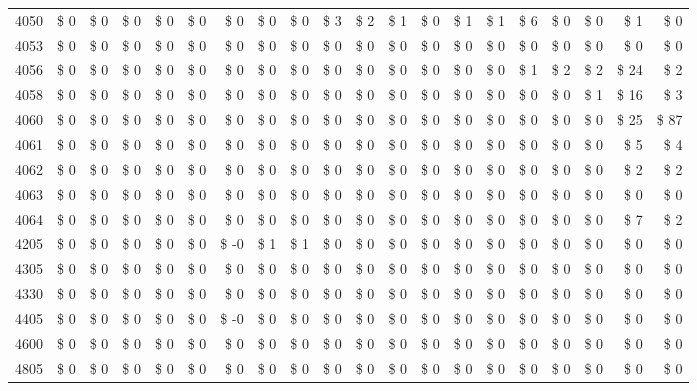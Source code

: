 \begin{longtable}{lrrrrrrrrrrrrrrrrrrr}
4050 & \$ 0 & \$ 0 & \$ 0 & \$ 0 & \$ 0 & \$ 0 & \$ 0 & \$ 0 & \$ 3 & \$ 2 & \$ 1 & \$ 0 & \$ 1 & \$ 1 & \$ 6 & \$ 0 & \$ 0 & \$ 1 & \$ 0 \\
4053 & \$ 0 & \$ 0 & \$ 0 & \$ 0 & \$ 0 & \$ 0 & \$ 0 & \$ 0 & \$ 0 & \$ 0 & \$ 0 & \$ 0 & \$ 0 & \$ 0 & \$ 0 & \$ 0 & \$ 0 & \$ 0 & \$ 0 \\
4056 & \$ 0 & \$ 0 & \$ 0 & \$ 0 & \$ 0 & \$ 0 & \$ 0 & \$ 0 & \$ 0 & \$ 0 & \$ 0 & \$ 0 & \$ 0 & \$ 0 & \$ 1 & \$ 2 & \$ 2 & \$ 24 & \$ 2 \\
4058 & \$ 0 & \$ 0 & \$ 0 & \$ 0 & \$ 0 & \$ 0 & \$ 0 & \$ 0 & \$ 0 & \$ 0 & \$ 0 & \$ 0 & \$ 0 & \$ 0 & \$ 0 & \$ 0 & \$ 1 & \$ 16 & \$ 3 \\
4060 & \$ 0 & \$ 0 & \$ 0 & \$ 0 & \$ 0 & \$ 0 & \$ 0 & \$ 0 & \$ 0 & \$ 0 & \$ 0 & \$ 0 & \$ 0 & \$ 0 & \$ 0 & \$ 0 & \$ 0 & \$ 25 & \$ 87 \\
4061 & \$ 0 & \$ 0 & \$ 0 & \$ 0 & \$ 0 & \$ 0 & \$ 0 & \$ 0 & \$ 0 & \$ 0 & \$ 0 & \$ 0 & \$ 0 & \$ 0 & \$ 0 & \$ 0 & \$ 0 & \$ 5 & \$ 4 \\
4062 & \$ 0 & \$ 0 & \$ 0 & \$ 0 & \$ 0 & \$ 0 & \$ 0 & \$ 0 & \$ 0 & \$ 0 & \$ 0 & \$ 0 & \$ 0 & \$ 0 & \$ 0 & \$ 0 & \$ 0 & \$ 2 & \$ 2 \\
4063 & \$ 0 & \$ 0 & \$ 0 & \$ 0 & \$ 0 & \$ 0 & \$ 0 & \$ 0 & \$ 0 & \$ 0 & \$ 0 & \$ 0 & \$ 0 & \$ 0 & \$ 0 & \$ 0 & \$ 0 & \$ 0 & \$ 0 \\
4064 & \$ 0 & \$ 0 & \$ 0 & \$ 0 & \$ 0 & \$ 0 & \$ 0 & \$ 0 & \$ 0 & \$ 0 & \$ 0 & \$ 0 & \$ 0 & \$ 0 & \$ 0 & \$ 0 & \$ 0 & \$ 7 & \$ 2 \\
4205 & \$ 0 & \$ 0 & \$ 0 & \$ 0 & \$ 0 & \$ -0 & \$ 1 & \$ 1 & \$ 0 & \$ 0 & \$ 0 & \$ 0 & \$ 0 & \$ 0 & \$ 0 & \$ 0 & \$ 0 & \$ 0 & \$ 0 \\
4305 & \$ 0 & \$ 0 & \$ 0 & \$ 0 & \$ 0 & \$ 0 & \$ 0 & \$ 0 & \$ 0 & \$ 0 & \$ 0 & \$ 0 & \$ 0 & \$ 0 & \$ 0 & \$ 0 & \$ 0 & \$ 0 & \$ 0 \\
4330 & \$ 0 & \$ 0 & \$ 0 & \$ 0 & \$ 0 & \$ 0 & \$ 0 & \$ 0 & \$ 0 & \$ 0 & \$ 0 & \$ 0 & \$ 0 & \$ 0 & \$ 0 & \$ 0 & \$ 0 & \$ 0 & \$ 0 \\
4405 & \$ 0 & \$ 0 & \$ 0 & \$ 0 & \$ 0 & \$ -0 & \$ 0 & \$ 0 & \$ 0 & \$ 0 & \$ 0 & \$ 0 & \$ 0 & \$ 0 & \$ 0 & \$ 0 & \$ 0 & \$ 0 & \$ 0 \\
4600 & \$ 0 & \$ 0 & \$ 0 & \$ 0 & \$ 0 & \$ 0 & \$ 0 & \$ 0 & \$ 0 & \$ 0 & \$ 0 & \$ 0 & \$ 0 & \$ 0 & \$ 0 & \$ 0 & \$ 0 & \$ 0 & \$ 0 \\
4805 & \$ 0 & \$ 0 & \$ 0 & \$ 0 & \$ 0 & \$ 0 & \$ 0 & \$ 0 & \$ 0 & \$ 0 & \$ 0 & \$ 0 & \$ 0 & \$ 0 & \$ 0 & \$ 0 & \$ 0 & \$ 0 & \$ 0 \\

\end{longtable}
